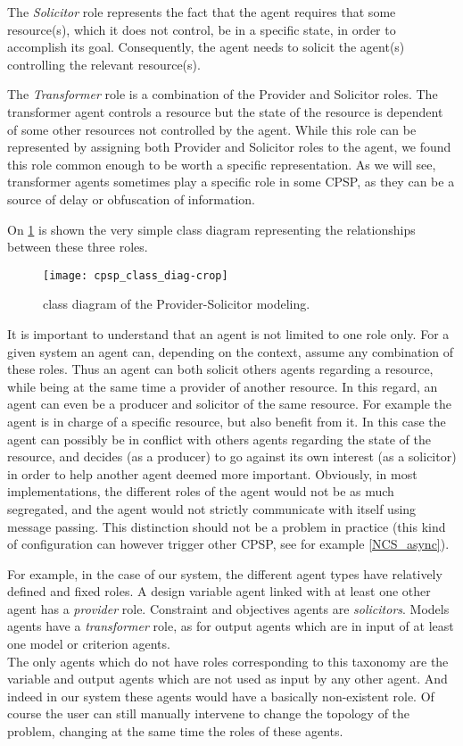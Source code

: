 The \emph{Solicitor} role represents the fact that the agent requires that some resource(s), which it does not control, be in a specific state, in order to accomplish its goal. Consequently, the agent needs to solicit the agent(s) controlling the relevant resource(s).

The \emph{Transformer} role is a combination of the Provider and Solicitor roles. The transformer agent controls a resource but the state of the resource is dependent of some other resources not controlled by the agent. While this role can be represented by assigning both Provider and Solicitor roles to the agent, we found this role common enough to be worth a specific representation. As we will see, transformer agents sometimes play a specific role in some CPSP, as they can be a source of delay or obfuscation of information.

On \figurename{} \ref{cpsp_class_diag} is shown the very simple class diagram representing the relationships between these three roles.

\begin{figure}
\centering
\texttt{[image: cpsp\_class\_diag-crop]}
\caption{class diagram of the Provider-Solicitor modeling.}
\label{cpsp_class_diag}
\end{figure}

It is important to understand that an agent is not limited to one role only. For a given system an agent can, depending on the context, assume any combination of these roles. Thus an agent can both solicit others agents regarding a resource, while being at the same time a provider of another resource.
In this regard, an agent can even be a producer and solicitor of the same resource. For example the agent is in charge of a specific resource, but also benefit from it. In this case the agent can possibly be in conflict with others agents regarding the state of the resource, and decides (as a producer) to go against its own interest (as a solicitor) in order to help another agent deemed more important.
Obviously, in most implementations, the different roles of the agent would not be as much segregated, and the agent would not strictly communicate with itself using message passing. This distinction should not be a problem in practice (this kind of configuration can however trigger other CPSP, see for example \ref{NCS_async}).

For example, in the case of our system, the different agent types have relatively defined and fixed roles. A design variable agent linked with at least one other agent has a \emph{provider} role. Constraint and objectives agents are \emph{solicitors}. Models agents have a \emph{transformer} role, as for output agents which are in input of at least one model or criterion agents.\\
The only agents which do not have roles corresponding to this taxonomy are the variable and output agents which are not used as input by any other agent. And indeed in our system these agents would have a basically non-existent role. Of course the user can still manually intervene to change the topology of the problem, changing at the same time the roles of these agents.

